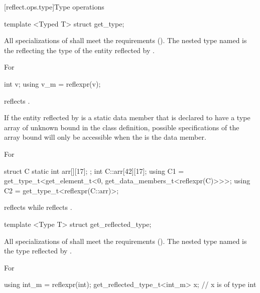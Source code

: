 [reflect.ops.type]{Type operations}

\begin{std.txt}\color{addclr}

\begin{itemdecl}
template <Typed T> struct get_type;
\end{itemdecl}

\begin{itemdescr}
\pnum
All specializations of  shall meet the  requirements (). The nested type named  is the  reflecting the type of the entity reflected by .

\pnum
\begin{example}
For
\begin{codeblock}
int v; using v_m = reflexpr(v);
\end{codeblock}
 reflects .
\end{example}

\pnum
If the entity reflected by  is a static data member that is declared to have a type array of unknown bound in the class definition, possible specifications of the array bound will only be accessible when the  is the data member.

\pnum
\begin{note}
For
\begin{codeblock}
struct C {
   static int arr[][17];
};
int C::arr[42][17];
using C1 = get_type_t<get_element_t<0, get_data_members_t<reflexpr(C)>>>;
using C2 = get_type_t<reflexpr(C::arr)>;
\end{codeblock}
 reflects  while  reflects .
\end{note}

\end{itemdescr}
\begin{itemdecl}
template <Type T> struct get_reflected_type;
\end{itemdecl}

\begin{itemdescr}
\pnum
All specializations of  shall meet the  requirements (). The nested type named  is the type reflected by .

\pnum
\begin{example}
For
\begin{codeblock}
using int_m = reflexpr(int);
get_reflected_type_t<int_m> x; // x is of type int
\end{codeblock}
\end{example}
\end{itemdescr}


\end{std.txt}
